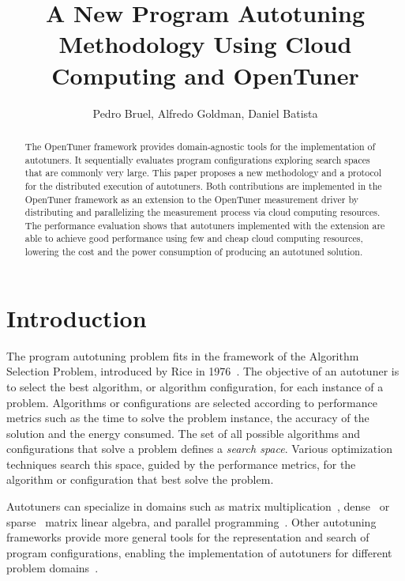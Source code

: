 \documentclass[12pt]{article}
\title{A New Program Autotuning Methodology Using Cloud Computing and OpenTuner}
\author{Pedro Bruel, Alfredo Goldman, Daniel Batista}
\begin{document}
\maketitle

\begin{abstract}

The OpenTuner framework provides domain-agnostic tools for the implementation
of autotuners. It sequentially evaluates program configurations exploring
search spaces that are commonly very large. This paper proposes a new
methodology and a protocol for the distributed execution of autotuners. Both
contributions are implemented in the OpenTuner framework as an extension to the
OpenTuner measurement driver by distributing and parallelizing the measurement
process via cloud computing resources. The performance evaluation shows that
autotuners implemented with the extension are able to achieve good performance
using few and cheap cloud computing resources, lowering the cost and the power
consumption of producing an autotuned solution.

\end{abstract}

\section{Introduction} \label{sec:intro}

The program autotuning problem fits in the framework of the Algorithm Selection
Problem, introduced by Rice in 1976~\cite{rice1976algorithm}. The objective of
an autotuner is to select the best algorithm, or algorithm configuration, for
each instance of a problem.  Algorithms or configurations are selected
according to performance metrics such as the time to solve the problem
instance, the accuracy of the solution and the energy consumed.  The set of all
possible algorithms and configurations that solve a problem defines a
\emph{search space}. Various optimization techniques search this space, guided
by the performance metrics, for the algorithm or configuration that best solve
the problem.

Autotuners can specialize in domains such as matrix
multiplication~\cite{bilmes1997phipac}, dense~\cite{whaley1998atlas} or
sparse~\cite{vuduc2005oski} matrix linear algebra, and parallel
programming~\cite{jordan2012multi}. Other autotuning frameworks provide more
general tools for the representation and search of program configurations,
enabling the implementation of autotuners for different problem
domains~\cite{ansel2014opentuner,hutter2009paramils}.
\end{document}
